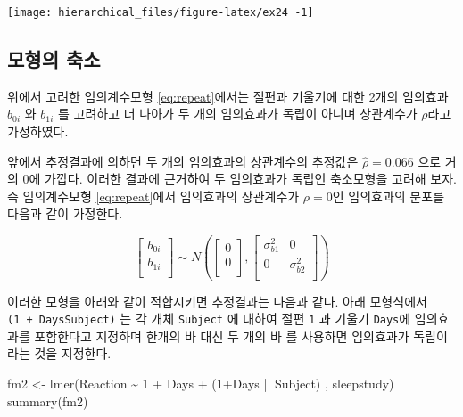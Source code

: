 \documentclass[
]{book}
\newenvironment{Shaded}{\begin{snugshade}}{\end{snugshade}}
\newcommand{\DecValTok}[1]{\textcolor[rgb]{0.00,0.00,0.81}{#1}}
\newcommand{\FunctionTok}[1]{\textcolor[rgb]{0.00,0.00,0.00}{#1}}
\newcommand{\NormalTok}[1]{#1}
\newcommand{\OtherTok}[1]{\textcolor[rgb]{0.56,0.35,0.01}{#1}}
\newcommand{\SpecialCharTok}[1]{\textcolor[rgb]{0.00,0.00,0.00}{#1}}
\begin{document}
\texttt{[image: hierarchical\_files/figure-latex/ex24 -1]}

\hypertarget{uxbaa8uxd615uxc758-uxcd95uxc18c}{%
\subsection{모형의 축소}\label{uxbaa8uxd615uxc758-uxcd95uxc18c}}

위에서 고려한 임의계수모형 \eqref{eq:repeat}에서는 절편과 기울기에 대한 2개의 임의효과 \(b_{0i}\) 와 \(b_{1i}\) 를 고려하고 더 나아가 두 개의 임의효과가 독립이 아니며 상관계수가 \(\rho\)라고 가정하였다.

앞에서 추정결과에 의하면 두 개의 임의효과의 상관계수의 추정값은 \(\hat \rho = 0.066\) 으로 거의 0에 가깝다. 이러한 결과에 근거하여 두 임의효과가 독립인
축소모형을 고려해 보자. 즉 임의계수모형 \eqref{eq:repeat}에서 임의효과의 상관계수가 \(\rho=0\)인 임의효과의 분포를 다음과 같이 가정한다.

\[ 
\begin{bmatrix}
b_{0i} \\
b_{1i} \\
\end{bmatrix} \sim
N \left (
\begin{bmatrix}
0 \\
0 \\
\end{bmatrix}
,
\begin{bmatrix}
\sigma^2_{b1} & 0\\
0 & \sigma^2_{b2} \\
\end{bmatrix}
\right )
\]

이러한 모형을 아래와 같이 적합시키면 추정결과는 다음과 같다. 아래 모형식에서 \texttt{(1\ +\ Days\textbar{}\textbar{}Subject)}
는 각 개체 \texttt{Subject} 에 대하여 절편 \texttt{1} 과 기울기 \texttt{Days}에 임의효과를 포함한다고 지정하며 한개의 바 \texttt{\textbar{}} 대신 두 개의 바 \texttt{\textbar{}\textbar{}} 를 사용하면 임의효과가 독립이라는 것을 지정한다.

\begin{Shaded}
\begin{Highlighting}[]
\NormalTok{fm2 }\OtherTok{\textless{}{-}} \FunctionTok{lmer}\NormalTok{(Reaction }\SpecialCharTok{\textasciitilde{}} \DecValTok{1} \SpecialCharTok{+}\NormalTok{ Days }\SpecialCharTok{+}\NormalTok{ (}\DecValTok{1}\SpecialCharTok{+}\NormalTok{Days }\SpecialCharTok{||}\NormalTok{ Subject) , sleepstudy)}
\FunctionTok{summary}\NormalTok{(fm2)}
\end{Highlighting}
\end{Shaded}
\end{document}

